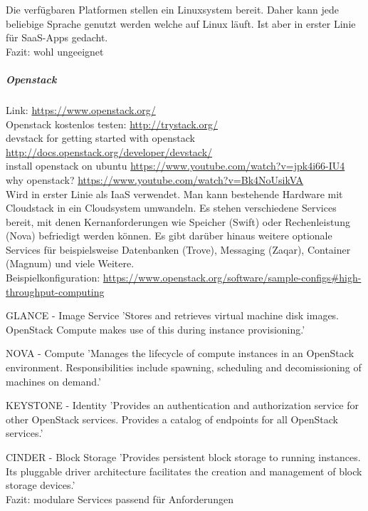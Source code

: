 \documentclass[a4paper,10pt]{article}
\begin{document}
Die verfügbaren Platformen stellen ein Linuxsystem bereit.
Daher kann jede beliebige Sprache genutzt werden welche auf Linux läuft.
Ist aber in erster Linie für SaaS-Apps gedacht.\\

Fazit:
wohl ungeeignet

\subparagraph{Openstack}

Link: \url{https://www.openstack.org/}\\
Openstack kostenlos testen: \url{http://trystack.org/}\\
devstack for getting started with openstack \url{http://docs.openstack.org/developer/devstack/}\\
install openstack on ubuntu \url{https://www.youtube.com/watch?v=jpk4i66-IU4}\\

why openstack? \url{https://www.youtube.com/watch?v=Bk4NoUsikVA}\\

Wird in erster Linie als IaaS verwendet.
Man kann bestehende Hardware mit Cloudstack in ein Cloudsystem umwandeln.
Es stehen verschiedene Services bereit, mit denen Kernanforderungen wie Speicher (Swift) oder Rechenleistung (Nova) befriedigt werden können.
Es gibt darüber hinaus weitere optionale Services für beispielsweise Datenbanken (Trove), Messaging (Zaqar), Container (Magnum) und viele Weitere.\\

Beispielkonfiguration: \url{https://www.openstack.org/software/sample-configs#high-throughput-computing}

GLANCE - Image Service
'Stores and retrieves virtual machine disk images. OpenStack Compute makes use of this during instance provisioning.'

NOVA - Compute
'Manages the lifecycle of compute instances in an OpenStack environment. Responsibilities include spawning, scheduling and decomissioning of machines on demand.'

KEYSTONE - Identity
'Provides an authentication and authorization service for other OpenStack services. Provides a catalog of endpoints for all OpenStack services.'

CINDER - Block Storage
'Provides persistent block storage to running instances. Its pluggable driver architecture facilitates the creation and management of block storage devices.'\\

Fazit:
modulare Services
passend für Anforderungen
\end{document}
